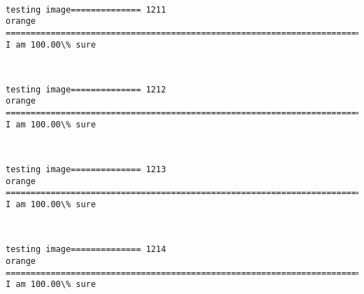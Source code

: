 \documentclass[11pt]{article}
\begin{document}
    \begin{center}
    \end{center}
    { \hspace*{\fill} \\}
    
    \begin{Verbatim}[commandchars=\\\{\}]
testing image============== 1211
orange
============================================================================
I am 100.00\% sure

    \end{Verbatim}

    \begin{center}
    \end{center}
    { \hspace*{\fill} \\}
    
    \begin{Verbatim}[commandchars=\\\{\}]
testing image============== 1212
orange
============================================================================
I am 100.00\% sure

    \end{Verbatim}

    \begin{center}
    \end{center}
    { \hspace*{\fill} \\}
    
    \begin{Verbatim}[commandchars=\\\{\}]
testing image============== 1213
orange
============================================================================
I am 100.00\% sure

    \end{Verbatim}

    \begin{center}
    \end{center}
    { \hspace*{\fill} \\}
    
    \begin{Verbatim}[commandchars=\\\{\}]
testing image============== 1214
orange
============================================================================
I am 100.00\% sure

    \end{Verbatim}
\end{document}
